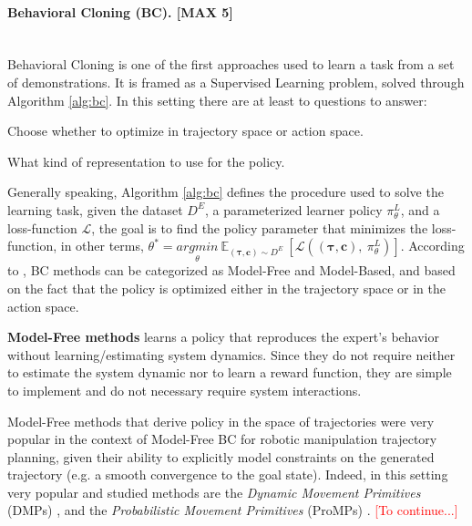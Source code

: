 \paragraph{Behavioral Cloning (BC). [MAX 5]} \mbox{} \\ 
Behavioral Cloning is one of the first approaches used to learn a task from a set of demonstrations. It is framed as a Supervised Learning problem, solved through Algorithm \ref{alg:bc}. In this setting there are at least to questions to answer: 
\begin{enumerate*}[label=\textbf{(\arabic*)}]
    \item Choose whether to optimize in trajectory space or action space.  
    \item What kind of representation to use for the policy.
\end{enumerate*}
Generally speaking, Algorithm \ref{alg:bc} defines the procedure used to solve the learning task, given the dataset $D^{E}$, a parameterized learner policy $\pi^{L}_{\theta}$, and a loss-function $\mathcal{L}$, the goal is to find the policy parameter that minimizes the loss-function, in other terms, $\theta^{*} = \underset{\theta}{argmin} \ \mathbb{E}_{(\boldsymbol{\tau}, \mathbf{c}) \sim D^{E}} \ [\mathcal{L}((\boldsymbol{\tau}, \mathbf{c}), \ \pi^{L}_{\theta})]$.
\newline According to \cite{osa2018algorithmic,zheng2021imitation_progress_taxonomies_opportunities}, BC methods can be categorized as Model-Free and Model-Based, and based on the fact that the policy is optimized either in the trajectory space or in the action space.
 

\textbf{Model-Free methods} learns a policy that reproduces the expert's behavior without learning/estimating system dynamics. Since they do not require neither to estimate the system dynamic nor to learn a reward function, they are simple to implement and do not necessary require system  interactions. 

Model-Free methods that derive policy in the space of trajectories were very popular in the context of Model-Free BC for robotic manipulation trajectory planning, given their ability to explicitly model constraints on the generated trajectory (e.g. a smooth convergence to the goal state). Indeed, in this setting very popular and studied methods are the \textit{Dynamic Movement Primitives} (DMPs) \cite{ijspeert2002learning,ijspeert2013dynamical}, and the \textit{Probabilistic Movement Primitives} (ProMPs) \cite{}. \textcolor{red}{[To continue...]}

